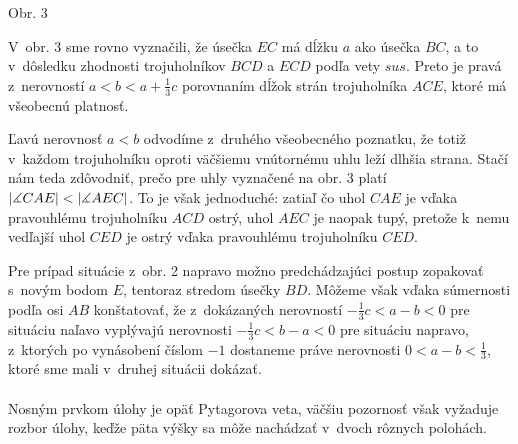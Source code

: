 {\begin{center}
Obr. 3
\end{center}
V~obr. 3 sme rovno vyznačili, že úsečka $EC$ má dĺžku $a$ ako úsečka $BC$, a to v~dôsledku zhodnosti trojuholníkov $BCD$ a $ECD$ podľa vety $sus$. Preto je pravá z~nerovností $a < b < a +\frac{1}{3}c$ porovnaním dĺžok strán trojuholníka $ACE$, ktoré má všeobecnú platnosť.

Ľavú nerovnosť $a < b$ odvodíme z~druhého všeobecného poznatku, že totiž v~každom trojuholníku oproti väčšiemu vnútornému uhlu leží dlhšia strana. Stačí nám teda zdôvodniť, prečo pre uhly vyznačené na obr. 3 platí $|\measuredangle CAE| < |\measuredangle AEC|$. To je však jednoduché: zatiaľ čo uhol $CAE$ je vďaka pravouhlému trojuholníku $ACD$ ostrý, uhol $AEC$ je naopak tupý, pretože k~nemu vedľajší uhol $CED$ je ostrý vďaka pravouhlému trojuholníku $CED$.

Pre prípad situácie z~obr. 2 napravo možno predchádzajúci postup zopakovať s~novým bodom $E$, tentoraz stredom úsečky $BD$. Môžeme však vďaka súmernosti podľa osi $AB$ konštatovať, že z~dokázaných nerovností $-\frac{1}{3}c < a - b < 0$ pre situáciu naľavo vyplývajú nerovnosti $-\frac{1}{3}c < b - a < 0$ pre situáciu napravo, z~ktorých po vynásobení číslom $-1$ dostaneme práve nerovnosti $0 < a - b <\frac{1}{3}$, ktoré sme mali v~druhej situácii dokázať.\\
\\
\kom Nosným prvkom úlohy je opäť Pytagorova veta, väčšiu pozornosť však vyžaduje rozbor úlohy, keďže päta výšky sa môže nachádzať v~dvoch rôznych polohách.\\
\\
}
